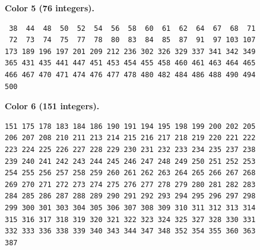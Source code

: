 \noindent\begin{minipage}{\linewidth}
\textbf{Color 5 (76 integers).}
\begin{lstlisting}
 38  44  48  50  52  54  56  58  60  61  62  64  67  68  71
 72  73  74  75  77  78  80  83  84  85  87  91  97 103 107
173 189 196 197 201 209 212 236 302 326 329 337 341 342 349
365 431 435 441 447 451 453 454 455 458 460 461 463 464 465
466 467 470 471 474 476 477 478 480 482 484 486 488 490 494
500
\end{lstlisting}
\end{minipage}\par\smallskip

\noindent\begin{minipage}{\linewidth}
\textbf{Color 6 (151 integers).}
\begin{lstlisting}
151 175 178 183 184 186 190 191 194 195 198 199 200 202 205
206 207 208 210 211 213 214 215 216 217 218 219 220 221 222
223 224 225 226 227 228 229 230 231 232 233 234 235 237 238
239 240 241 242 243 244 245 246 247 248 249 250 251 252 253
254 255 256 257 258 259 260 261 262 263 264 265 266 267 268
269 270 271 272 273 274 275 276 277 278 279 280 281 282 283
284 285 286 287 288 289 290 291 292 293 294 295 296 297 298
299 300 301 303 304 305 306 307 308 309 310 311 312 313 314
315 316 317 318 319 320 321 322 323 324 325 327 328 330 331
332 333 336 338 339 340 343 344 347 348 352 354 355 360 363
387
\end{lstlisting}
\end{minipage}\par\smallskip
